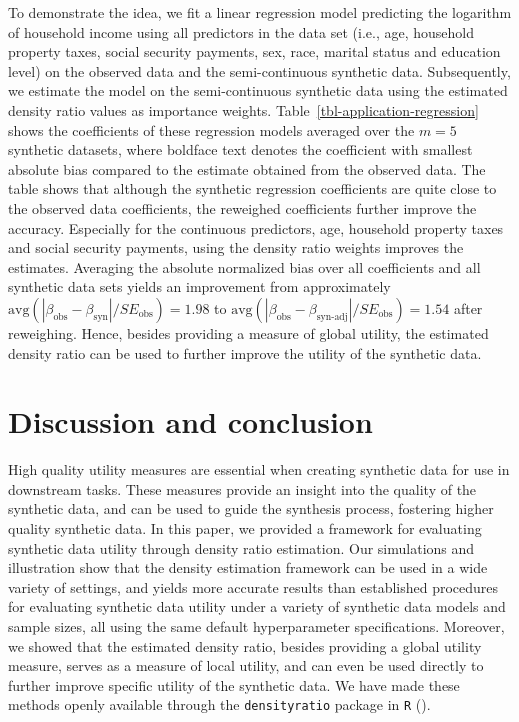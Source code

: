 \documentclass[
]{article}
\begin{document}
To demonstrate the idea, we fit a linear regression model predicting the
logarithm of household income using all predictors in the data set
(i.e., age, household property taxes, social security payments, sex,
race, marital status and education level) on the observed data and the
semi-continuous synthetic data. Subsequently, we estimate the model on
the semi-continuous synthetic data using the estimated density ratio
values as importance weights. Table~\ref{tbl-application-regression}
shows the coefficients of these regression models averaged over the
\(m=5\) synthetic datasets, where boldface text denotes the coefficient
with smallest absolute bias compared to the estimate obtained from the
observed data. The table shows that although the synthetic regression
coefficients are quite close to the observed data coefficients, the
reweighed coefficients further improve the accuracy. Especially for the
continuous predictors, age, household property taxes and social security
payments, using the density ratio weights improves the estimates.
Averaging the absolute normalized bias over all coefficients and all
synthetic data sets yields an improvement from approximately
\(\text{avg}(|\beta_\text{obs}-\beta_\text{syn}|/SE_\text{obs}) = 1.98\)
to
\(\text{avg}(|\beta_\text{obs}-\beta_\text{syn-adj}|/SE_\text{obs}) = 1.54\)
after reweighing. Hence, besides providing a measure of global utility,
the estimated density ratio can be used to further improve the utility
of the synthetic data.

\section{Discussion and conclusion}\label{discussion-and-conclusion}

High quality utility measures are essential when creating synthetic data
for use in downstream tasks. These measures provide an insight into the
quality of the synthetic data, and can be used to guide the synthesis
process, fostering higher quality synthetic data. In this paper, we
provided a framework for evaluating synthetic data utility through
density ratio estimation. Our simulations and illustration show that the
density estimation framework can be used in a wide variety of settings,
and yields more accurate results than established procedures for
evaluating synthetic data utility under a variety of synthetic data
models and sample sizes, all using the same default hyperparameter
specifications. Moreover, we showed that the estimated density ratio,
besides providing a global utility measure, serves as a measure of local
utility, and can even be used directly to further improve specific
utility of the synthetic data. We have made these methods openly
available through the \texttt{densityratio} package in \texttt{R}
().
\end{document}
